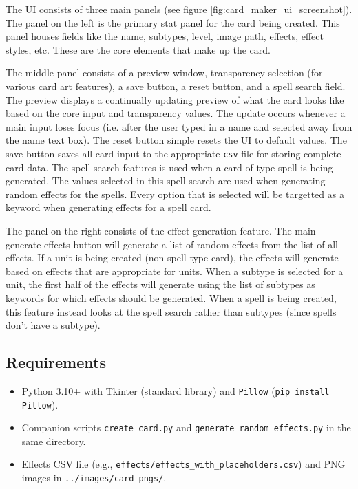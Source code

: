 The UI consists of three main panels (see figure \ref{fig:card_maker_ui_screenshot}). The panel on the left is the primary stat panel for the card being created. This panel houses fields like the name, subtypes, level, image path, effects, effect styles, etc. These are the core elements that make up the card. 

The middle panel consists of a preview window, transparency selection (for various card art features), a save button, a reset button, and a spell search field. The preview displays a continually updating preview of what the card looks like based on the core input and transparency values. The update occurs whenever a main input loses focus (i.e. after the user typed in a name and selected away from the name text box). The reset button simple resets the UI to default values. The save button saves all card input to the appropriate \texttt{csv} file for storing complete card data. The spell search features is used when a card of type spell is being generated. The values selected in this spell search are used when generating random effects for the spells. Every option that is selected will be targetted as a keyword when generating effects for a spell card.

The panel on the right consists of the effect generation feature. The main generate effects button will generate a list of random effects from the list of all effects. If a unit is being created (non-spell type card), the effects will generate based on effects that are appropriate for units. When a subtype is selected for a unit, the first half of the effects will generate using the list of subtypes as keywords for which effects should be generated. When a spell is being created, this feature instead looks at the spell search rather than subtypes (since spells don't have a subtype).

\subsection{Requirements}
\begin{itemize}
	\item Python 3.10+ with Tkinter (standard library) and \texttt{Pillow} (\texttt{pip install Pillow}).
	\item Companion scripts \texttt{create\_card.py} and \texttt{generate\_random\_effects.py} in the same directory.
	\item Effects CSV file (e.g., \texttt{effects/effects\_with\_placeholders.csv}) and PNG images in \texttt{../images/card pngs/}.
\end{itemize}


